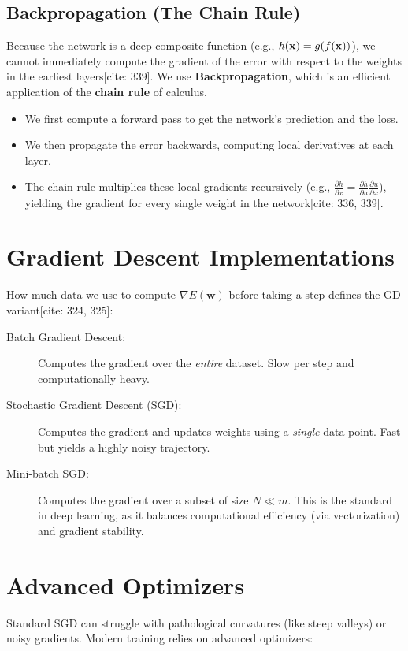 \subsection*{Backpropagation (The Chain Rule)}
Because the network is a deep composite function (e.g., $h(\mathbf{x}) = g(f(\mathbf{x}))$), we cannot immediately compute the gradient of the error with respect to the weights in the earliest layers[cite: 339]. We use \textbf{Backpropagation}, which is an efficient application of the \textbf{chain rule} of calculus.
\begin{itemize}
    \item We first compute a forward pass to get the network's prediction and the loss.
    \item We then propagate the error backwards, computing local derivatives at each layer.
    \item The chain rule multiplies these local gradients recursively (e.g., $\frac{\partial h}{\partial x} = \frac{\partial h}{\partial u} \frac{\partial u}{\partial x}$), yielding the gradient for every single weight in the network[cite: 336, 339].
\end{itemize}

\section*{Gradient Descent Implementations}

How much data we use to compute $\nabla E(\mathbf{w})$ before taking a step defines the GD variant[cite: 324, 325]:
\begin{description}
    \item[Batch Gradient Descent:] Computes the gradient over the \textit{entire} dataset. Slow per step and computationally heavy.
    \item[Stochastic Gradient Descent (SGD):] Computes the gradient and updates weights using a \textit{single} data point. Fast but yields a highly noisy trajectory.
    \item[Mini-batch SGD:] Computes the gradient over a subset of size $N \ll m$. This is the standard in deep learning, as it balances computational efficiency (via vectorization) and gradient stability.
\end{description}

\section*{Advanced Optimizers}

Standard SGD can struggle with pathological curvatures (like steep valleys) or noisy gradients. Modern training relies on advanced optimizers:

